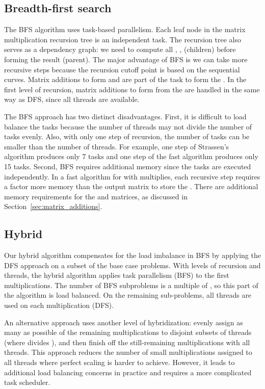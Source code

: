 \documentclass[preprint]{sigplanconf}
\begin{document}
\subsection{Breadth-first search}
\label{sec:par_bfs}

The BFS algorithm uses task-based parallelism.
Each leaf node in the matrix multiplication recursion tree is an independent task.
The recursion tree also serves as a dependency graph: we need to compute all , , (children) before forming the result (parent).
The major advantage of BFS is we can take more recursive steps because the recursion cutoff point is based on the sequential  curves.
Matrix additions to form  and  are part of the task to form the .
In the first level of recursion, matrix additions to form  from the  
are handled in the same way as DFS, since all threads are available.

The BFS approach has two distinct disadvantages.
First, it is difficult to load balance the tasks because the number of threads may not divide the number of tasks evenly.
Also, with only one step of recursion, the number of tasks can be smaller than the number of threads.
For example, one step of Strassen's algorithm produces only 7 tasks and one step of the fast  algorithm produces only 15 tasks.
Second, BFS requires additional memory since the tasks are executed independently.
In a fast algorithm for  with  multiplies, each recursive step requires a factor  more memory than the output matrix  to store the .
There are additional memory requirements for the  and  matrices, as discussed in Section~\ref{sec:matrix_additions}.

\subsection{Hybrid}
\label{sec:par_hybrid}

Our hybrid algorithm compensates for the load imbalance in BFS by applying the DFS approach on a subset of the base case problems.
With  levels of recursion and  threads, the hybrid algorithm applies task parallelism (BFS) to the first  multiplications.
The number of BFS subproblems is a multiple of , so this part of the algorithm is load balanced.
On the remaining  sub-problems, all threads are used on each multiplication (DFS).

An alternative approach uses another level of hybridization: evenly assign as many as possible of the remaining  multiplications to disjoint subsets of  threads (where  divides ), and then finish off the still-remaining multiplications with all  threads.
This approach reduces the number of small multiplications assigned to all  threads where perfect scaling is harder to achieve.
However, it leads to additional load balancing concerns in practice and requires a more complicated task scheduler.
\end{document}
